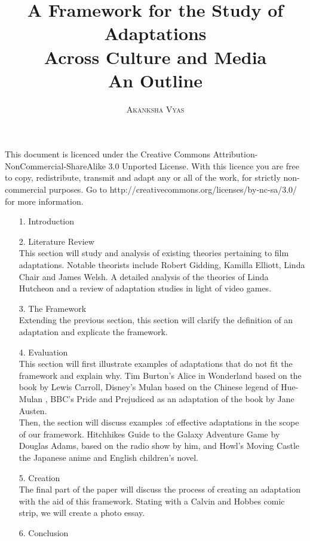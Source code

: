 \documentclass{article}[12pt]
\title{A Framework for the Study of Adaptations \\ Across Culture and Media \\ \small{An Outline}}
\author{\textsc{Akanksha Vyas}}
\date{}
\begin{document}
\maketitle

 This document is licenced under the Creative Commons
 Attribution-NonCommercial-ShareAlike 3.0 Unported License. With this licence
 you are free to copy, redistribute, transmit and adapt any or all of the work,
for strictly non-commercial purposes. 
 Go to http://creativecommons.org/licenses/by-nc-sa/3.0/ for more information.
 \\
\begin{itemize}
\item[1. ] Introduction 
\item[2. ] Literature Review \\
This section will study and analysis of existing theories pertaining to film adaptations. Notable theorists include Robert Gidding, Kamilla Elliott, Linda Chair and James Welsh. A detailed analysis of the theories of Linda Hutcheon and a review of adaptation studies in light of video games. 
\item[3. ] The Framework \\
Extending the previous section, this section will clarify the definition of an adaptation and explicate the framework. 
\item[4. ] Evaluation \\
This section will first illustrate examples of adaptations that do not fit the framework and explain why. Tim Burton's Alice in Wonderland based on the book by Lewis Carroll, Disney's Mulan based on the Chinese legend of Hue-Mulan , BBC's Pride and Prejudiced as an adaptation of the book by Jane Austen. \\
Then, the section will discuss examples :of effective adaptations in the scope of our framework. Hitchhikes Guide to the Galaxy Adventure Game by Douglas Adams, based on the radio show by him, and Howl's Moving Castle the Japanese anime and English children's novel. 
\item[5. ] Creation \\
The final part of the paper will discuss the process of creating an adaptation with the aid of this framework. Stating with a Calvin and Hobbes comic strip, we will create a photo essay. 
\item[6. ] Conclusion
\end{itemize}
\end{document}
